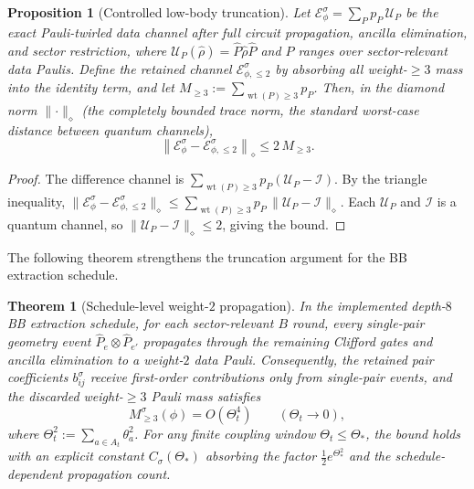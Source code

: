 \documentclass[
aps,
prx,
10pt,
twocolumn,
groupedaddress,
longbibliography,
nofootinbib,
floatfix
]{revtex4-2}
\newtheorem{theorem}{Theorem}
\newtheorem{proposition}{Proposition}
\theoremstyle{definition}
\DeclareMathOperator{\wt}{wt}
\begin{document}
\begin{proposition}[Controlled low-body truncation]
\label{prop:truncation}
Let $\mathcal{E}^{\sigma}_{\phi}=\sum_P p_P\,\mathcal{U}_P$ be the exact Pauli-twirled data channel after full circuit propagation, ancilla elimination, and sector restriction, where $\mathcal{U}_P(\hat\rho)=\hat P\hat\rho\hat P$ and $P$ ranges over sector-relevant data Paulis. Define the retained channel $\mathcal{E}^{\sigma}_{\phi,\le 2}$ by absorbing all weight-$\ge 3$ mass into the identity term, and let $M_{\ge 3}:=\sum_{\wt(P)\ge 3}p_P$. Then, in the diamond norm $\lVert\cdot\rVert_{\diamond}$ (the completely bounded trace norm, the standard worst-case distance between quantum channels),
\begin{equation}
\left\lVert\mathcal{E}^{\sigma}_{\phi}-\mathcal{E}^{\sigma}_{\phi,\le 2}\right\rVert_{\diamond}\le 2\,M_{\ge 3}.
\label{eq:truncation-bound}
\end{equation}
\end{proposition}

\begin{proof}
The difference channel is $\sum_{\wt(P)\ge 3}p_P(\mathcal{U}_P-\mathcal{I})$. By the triangle inequality, $\lVert\mathcal{E}^{\sigma}_{\phi}-\mathcal{E}^{\sigma}_{\phi,\le 2}\rVert_{\diamond}\le\sum_{\wt(P)\ge 3}p_P\,\lVert\mathcal{U}_P-\mathcal{I}\rVert_{\diamond}$. Each $\mathcal{U}_P$ and $\mathcal{I}$ is a quantum channel, so $\lVert\mathcal{U}_P-\mathcal{I}\rVert_{\diamond}\le 2$, giving the bound.
\end{proof}

The following theorem strengthens the truncation argument for the BB extraction schedule.

\begin{theorem}[Schedule-level weight-$2$ propagation]
\label{thm:schedule-prop}
In the implemented depth-$8$ BB extraction schedule, for each sector-relevant $B$ round, every single-pair geometry event $\hat P_e\otimes\hat P_{e'}$ propagates through the remaining Clifford gates and ancilla elimination to a weight-$2$ data Pauli. Consequently, the retained pair coefficients $b_{ij}^{\sigma}$ receive first-order contributions only from single-pair events, and the discarded weight-$\ge 3$ Pauli mass satisfies
\begin{equation}
M_{\ge 3}^{\sigma}(\phi) = O(\Theta_t^4) \qquad (\Theta_t\to 0),
\label{eq:schedule-remainder}
\end{equation}
where $\Theta_t^2:=\sum_{a\in A_t}\theta_a^2$. For any finite coupling window $\Theta_t\le\Theta_\ast$, the bound holds with an explicit constant $C_\sigma(\Theta_\ast)$ absorbing the factor $\tfrac{1}{2}e^{\Theta_\ast^2}$ and the schedule-dependent propagation count.
\end{theorem}
\end{document}
